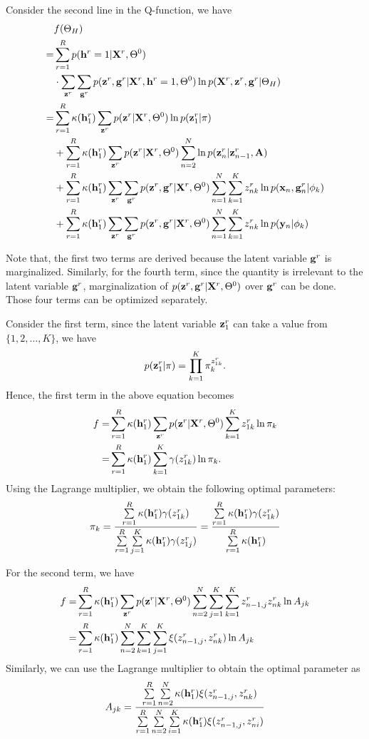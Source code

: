 Consider the second line in the Q-function, we have
\begin{align*}
  & f(\Theta_H) \\
= & \sum\limits_{r=1}^R p(\mathbf{h}^r = 1| \mathbf{X}^r, \Theta^0) \\
&  \cdot \sum\limits_{\mathbf{z}^r} \sum\limits_{\mathbf{g}^r} p( \mathbf{z}^r, \mathbf{g}^r| \mathbf{X}^r, \mathbf{h}^r = 1,\Theta^0) \ln p(\mathbf{X}^r, \mathbf{z}^r, \mathbf{g}^r| \Theta_H)  \\
  = & \sum\limits_{r=1}^R \kappa(\mathbf{h}^r_1) \sum\limits_{\mathbf{z}^r} p(\mathbf{z}^r | \mathbf{X}^r, \Theta^0) \ln p(\mathbf{z}^r_1 | \pi) \\
& + \sum\limits_{r=1}^R \kappa(\mathbf{h}^r_1) \sum\limits_{\mathbf{z}^r} p(\mathbf{z}^r | \mathbf{X}^r, \Theta^0) \sum\limits_{n=2}^N \ln p(\mathbf{z}^r_n | \mathbf{z}^r_{n-1}, \mathbf{A}) \\
& + \sum\limits_{r=1}^R \kappa(\mathbf{h}^r_1) \sum\limits_{\mathbf{z}^r} \sum\limits_{\mathbf{g}^r} p(\mathbf{z}^r, \mathbf{g}^r| \mathbf{X}^r, \Theta^0) \sum\limits_{n=1}^N \sum\limits_{k=1}^K z^r_{nk} \ln p(\mathbf{x}_n, \mathbf{g}_n^r | \phi_k) \\
& +\sum\limits_{r=1}^R \kappa(\mathbf{h}^r_1)  \sum\limits_{\mathbf{z}^r} \sum\limits_{\mathbf{g}^r} p(\mathbf{z}^r, \mathbf{g}^r| \mathbf{X}^r, \Theta^0) \sum\limits_{n=1}^N \sum\limits_{k=1}^K z^r_{nk} \ln p(\mathbf{y}_n | \phi_k) \\
\end{align*}

Note that, the first two terms are derived because the latent variable $\mathbf{g}^r$
is marginalized. Similarly, for the fourth term, since the quantity is
irrelevant to the latent variable $\mathbf{g}^r$, marginalization of $p(\mathbf{z}^r, \mathbf{g}^r| \mathbf{X}^r,
\Theta^0)$ over $\mathbf{g}^r$ can be done.  Those four terms can be optimized
separately. 


Consider the first term, since the latent variable $\mathbf{z}_1^r$ can take a value from
$\{1, 2, \ldots, K\}$, we have 
$$
p(\mathbf{z}_1^r | \pi) = \prod\limits_{k=1}^K \pi_k^{z_{1k}^r}.
$$
Hence, the first term in the above equation becomes 
\begin{align*}
f = & \sum\limits_{r=1}^R \kappa(\mathbf{h}^r_1) \sum\limits_{\mathbf{z}^r} p(\mathbf{z}^r | \mathbf{X}^r, \Theta^0) \sum\limits_{k=1}^K z_{1k}^r \ln \pi_k \\
= & \sum\limits_{r=1}^R \kappa(\mathbf{h}^r_1) \sum\limits_{k=1}^K \gamma(z_{1k}^r) \ln \pi_k.
\end{align*}
Using the Lagrange multiplier, we obtain the following optimal parameters:
$$
\pi_k = \frac{\sum\limits_{r=1}^R \kappa(\mathbf{h}^r_1)  \gamma(z_{1k}^r)} 
{\sum\limits_{r=1}^R  \sum\limits_{j=1}^K \kappa(\mathbf{h}^r_1) \gamma(z_{1j}^r)} 
 = \frac{\sum\limits_{r=1}^R \kappa(\mathbf{h}^r_1)  \gamma(z_{1k}^r)} 
{\sum\limits_{r=1}^R   \kappa(\mathbf{h}^r_1) } 
$$


For the second term, we have
\begin{align*}
  f = & \sum\limits_{r=1}^R \kappa(\mathbf{h}^r_1) \sum\limits_{\mathbf{z}^r} p(\mathbf{z}^r | \mathbf{X}^r, \Theta^0) \sum\limits_{n=2}^N \sum\limits_{j=1}^K \sum\limits_{k=1}^K z_{n-1, j}^r z_{nk}^r \ln A_{jk} \\
  = & \sum\limits_{r=1}^R \kappa(\mathbf{h}^r_1) \sum\limits_{n=2}^N \sum\limits_{k=1}^K \sum\limits_{j=1}^K \xi(z_{n-1, j}^r, z_{nk}^r) \ln A_{jk} \\
\end{align*}
Similarly, we can use the Lagrange multiplier to obtain the optimal parameter as
$$
A_{jk} = \frac{ \sum\limits_{r=1}^R  \sum\limits_{n=2}^N \kappa(\mathbf{h}^r_1) \xi(z_{n-1, j}^r, z_{nk}^r )}
{ \sum\limits_{r=1}^R \sum\limits_{n=2}^N \sum\limits_{i=1}^K \kappa(\mathbf{h}^r_1) \xi(z_{n-1, j}^r, z_{ni}^r )}
$$



